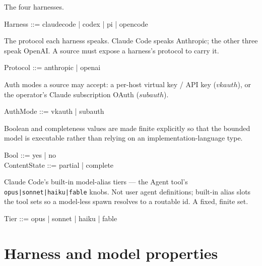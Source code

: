\documentclass{article}
\begin{document}
\begin{zed}
\end{zed}

\begin{zed}
\end{zed}

The four harnesses.

\begin{zed}
	Harness ::= claudecode | codex | pi | opencode
\end{zed}

The protocol each harness speaks. Claude Code speaks Anthropic; the other three
speak OpenAI. A source must expose a harness's protocol to carry it.

\begin{zed}
	Protocol ::= anthropic | openai
\end{zed}

Auth modes a source may accept: a per-host virtual key / API key ($vkauth$), or
the operator's Claude subscription OAuth ($subauth$).

\begin{zed}
	AuthMode ::= vkauth | subauth
\end{zed}

Boolean and completeness values are made finite explicitly so that the bounded
model is executable rather than relying on an implementation-language type.

\begin{zed}
	Bool ::= yes | no \\
	ContentState ::= partial | complete
\end{zed}

Claude Code's built-in model-alias tiers --- the Agent tool's
\texttt{opus|sonnet|haiku|fable} knobs. Not user agent definitions; built-in
alias slots the tool sets so a model-less spawn resolves to a routable id. A
fixed, finite set.

\begin{zed}
	Tier ::= opus | sonnet | haiku | fable
\end{zed}

\section{Harness and model properties}
\end{document}
